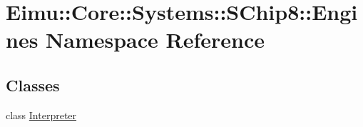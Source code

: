 \hypertarget{namespace_eimu_1_1_core_1_1_systems_1_1_s_chip8_1_1_engines}{
\section{Eimu::Core::Systems::SChip8::Engines Namespace Reference}
\label{namespace_eimu_1_1_core_1_1_systems_1_1_s_chip8_1_1_engines}
}
\subsection*{Classes}
\begin{DoxyCompactItemize}
\item 
class \hyperlink{class_eimu_1_1_core_1_1_systems_1_1_s_chip8_1_1_engines_1_1_interpreter}{Interpreter}
\end{DoxyCompactItemize}
